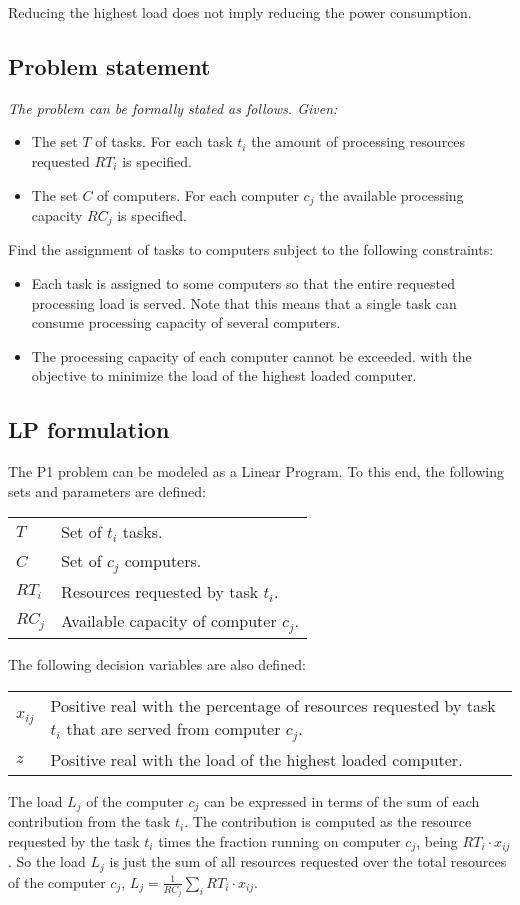 \documentclass[11pt,a4paper,twocolumn]{article}
\begin{document}
Reducing the highest load does not imply reducing the power consumption.

\subsection*{Problem statement}

\sl
The problem can be formally stated as follows. Given:
\begin{itemize}
\item The set $T$ of tasks. For each task $t_i$ the amount of processing 
resources requested $RT_i$ is specified.
\item The set $C$ of computers. For each computer $c_j$ the available processing 
capacity $RC_j$ is specified.
\end{itemize}
Find the assignment of tasks to computers subject to the following constraints: 
\begin{itemize}
\item Each task is assigned to some computers so that the entire requested 
processing load is served. Note that this means that a single task can consume 
processing capacity of several computers.
\item The processing capacity of each computer cannot be exceeded.  with the 
objective to minimize the load of the highest loaded computer.
\end{itemize}

\subsection*{LP formulation}
The P1 problem can be modeled as a Linear Program. To this end, the following 
sets and parameters are defined:
%
\begin{center}
\begin{tabular}{l l}
$T$    & Set of $t_i$ tasks. \\
$C$    & Set of $c_j$ computers.\\
$RT_i$ & Resources requested by task $t_i$.\\
$RC_j$ & Available capacity of computer $c_j$.
\end{tabular}
\end{center}
%
The following decision variables are also defined:
\begin{center}
\begin{tabular}{p{.1\linewidth} p{.8\linewidth}}
$x_{ij}$ & Positive real with the percentage of resources requested by task 
$t_i$ that are served from computer $c_j$.\\
%
$z$ & Positive real with the load of the highest loaded computer.
\end{tabular}
\end{center}
%
The load $L_j$ of the computer $c_j$ can be expressed in terms of the sum of 
each contribution from the task $t_i$. The contribution is computed as the 
resource requested by the task $t_i$ times the fraction running on computer 
$c_j$, being $RT_i \cdot x_{ij}$. So the load $L_j$ is just the sum of all 
resources requested over the total resources of the computer $c_j$, $L_j = 
\frac{1}{RC_j} \sum_i RT_i \cdot x_{ij}$.
\end{document}
